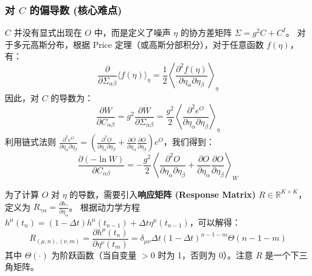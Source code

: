 \documentclass[UTF8]{ctexart}
\begin{document}
\subsubsection{对 $C$ 的偏导数 (核心难点)}
$C$ 并没有显式出现在 $O$ 中，而是定义了噪声 $\eta$ 的协方差矩阵 $\Sigma = g^2 C + C^I$。
对于多元高斯分布，根据 Price 定理（或高斯分部积分），对于任意函数 $f(\eta)$，有：
\begin{equation}
    \frac{\partial}{\partial \Sigma_{\alpha\beta}} \langle f(\eta) \rangle_\eta = \frac{1}{2} \left\langle \frac{\partial^2 f(\eta)}{\partial \eta_\alpha \partial \eta_\beta} \right\rangle_\eta
\end{equation}
因此，对 $C$ 的导数为：
\begin{equation}
    \frac{\partial W}{\partial C_{\alpha\beta}} = g^2 \frac{\partial W}{\partial \Sigma_{\alpha\beta}} = \frac{g^2}{2} \left\langle \frac{\partial^2 e^O}{\partial \eta_\alpha \partial \eta_\beta} \right\rangle_\eta
\end{equation}
利用链式法则 $\frac{\partial^2 e^O}{\partial \eta_\alpha \partial \eta_\beta} = \left( \frac{\partial^2 O}{\partial \eta_\alpha \partial \eta_\beta} + \frac{\partial O}{\partial \eta_\alpha} \frac{\partial O}{\partial \eta_\beta} \right) e^O$，我们得到：
\begin{equation}
    \frac{\partial (-\ln W)}{\partial C_{\alpha\beta}} = - \frac{g^2}{2} \left\langle \frac{\partial^2 O}{\partial \eta_\alpha \partial \eta_\beta} + \frac{\partial O}{\partial \eta_\alpha} \frac{\partial O}{\partial \eta_\beta} \right\rangle_W
\end{equation}

为了计算 $O$ 对 $\eta$ 的导数，需要引入\textbf{响应矩阵 (Response Matrix)} $R \in \mathbb{R}^{K \times K}$，定义为 $R_{\gamma\alpha} = \frac{\partial h_\gamma}{\partial \eta_\alpha}$。
根据动力学方程 $h^\mu(t_n) = (1 - \Delta t)h^\mu(t_{n-1}) + \Delta t \eta^\mu(t_{n-1})$，可以解得：
\begin{equation}
    R_{(\mu, n), (\nu, m)} = \frac{\partial h^\mu(t_n)}{\partial \eta^\nu(t_m)} = \delta_{\mu\nu} \Delta t (1 - \Delta t)^{n - 1 - m} \Theta(n - 1 - m)
\end{equation}
其中 $\Theta(\cdot)$ 为阶跃函数（当自变量 $>0$ 时为 1，否则为 0）。注意 $R$ 是一个下三角矩阵。
\end{document}
